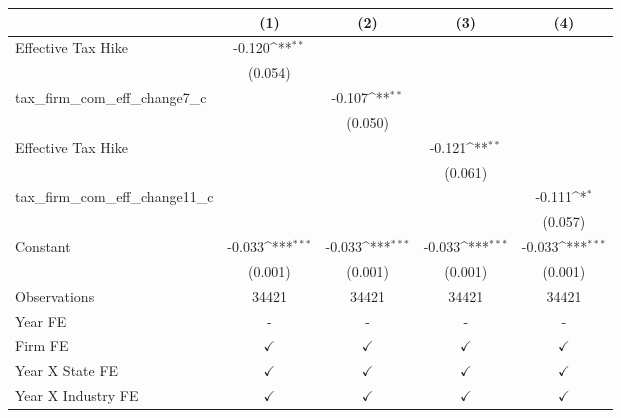 {
\def\sym#1{\ifmmode^{#1}\else\(^{#1}\)\fi}
\begin{tabular}{l*{4}{c}}
\toprule
                    &\multicolumn{1}{c}{(1)}         &\multicolumn{1}{c}{(2)}         &\multicolumn{1}{c}{(3)}         &\multicolumn{1}{c}{(4)}         \\
\midrule
Effective Tax Hike  &      -0.120\sym{**} &                     &                     &                     \\
                    &     (0.054)         &                     &                     &                     \\
tax\_firm\_com\_eff\_change7\_c&                     &      -0.107\sym{**} &                     &                     \\
                    &                     &     (0.050)         &                     &                     \\
Effective Tax Hike  &                     &                     &      -0.121\sym{**} &                     \\
                    &                     &                     &     (0.061)         &                     \\
tax\_firm\_com\_eff\_change11\_c&                     &                     &                     &      -0.111\sym{*}  \\
                    &                     &                     &                     &     (0.057)         \\
Constant            &      -0.033\sym{***}&      -0.033\sym{***}&      -0.033\sym{***}&      -0.033\sym{***}\\
                    &     (0.001)         &     (0.001)         &     (0.001)         &     (0.001)         \\
\midrule
Observations        &       34421         &       34421         &       34421         &       34421         \\
Year FE             &           -         &           -         &           -         &           -         \\
Firm FE             &$\checkmark$         &$\checkmark$         &$\checkmark$         &$\checkmark$         \\
Year X State FE     &$\checkmark$         &$\checkmark$         &$\checkmark$         &$\checkmark$         \\
Year X Industry FE  &$\checkmark$         &$\checkmark$         &$\checkmark$         &$\checkmark$         \\
\bottomrule
\end{tabular}
}
